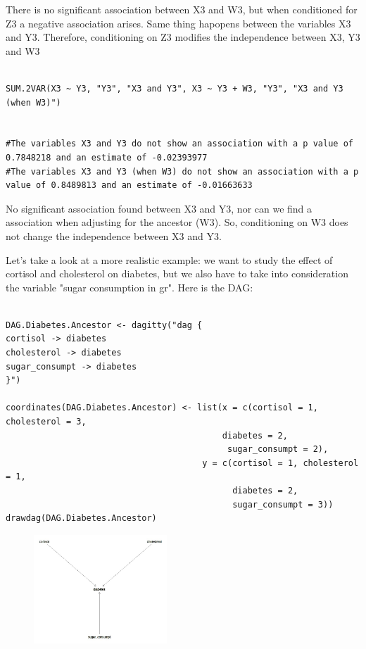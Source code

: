 \documentclass{article}
\begin{document}
There is no significant association between X3 and W3, but when conditioned for Z3 a negative association arises. Same thing hapopens between the  variables X3 and Y3. Therefore, conditioning on Z3 modifies the independence between X3, Y3 and W3



\begin{lstlisting}

SUM.2VAR(X3 ~ Y3, "Y3", "X3 and Y3", X3 ~ Y3 + W3, "Y3", "X3 and Y3 (when W3)")


#The variables X3 and Y3 do not show an association with a p value of 0.7848218 and an estimate of -0.02393977 
#The variables X3 and Y3 (when W3) do not show an association with a p value of 0.8489813 and an estimate of -0.01663633 

\end{lstlisting}

No significant association found between X3 and Y3, nor can we find a  association when adjusting for the ancestor (W3). So, conditioning on W3 does not change the independence between X3 and Y3.

Let's take a look at a more realistic example: we want to study the effect of cortisol and cholesterol on diabetes, but we also have to take into consideration the variable "sugar consumption in gr". Here is the DAG:


\begin{lstlisting}

DAG.Diabetes.Ancestor <- dagitty("dag {
cortisol -> diabetes
cholesterol -> diabetes
sugar_consumpt -> diabetes
}")

coordinates(DAG.Diabetes.Ancestor) <- list(x = c(cortisol = 1, cholesterol = 3,
                                           diabetes = 2, 
                                            sugar_consumpt = 2),
                                       y = c(cortisol = 1, cholesterol = 1, 
                                             diabetes = 2, 
                                             sugar_consumpt = 3))
drawdag(DAG.Diabetes.Ancestor)

\end{lstlisting}


\begin{figure}[h]
\includegraphics[width=5cm]{DAG_DIAB_ANCESTOR.png}
\centering
\end{figure}
\end{document}
